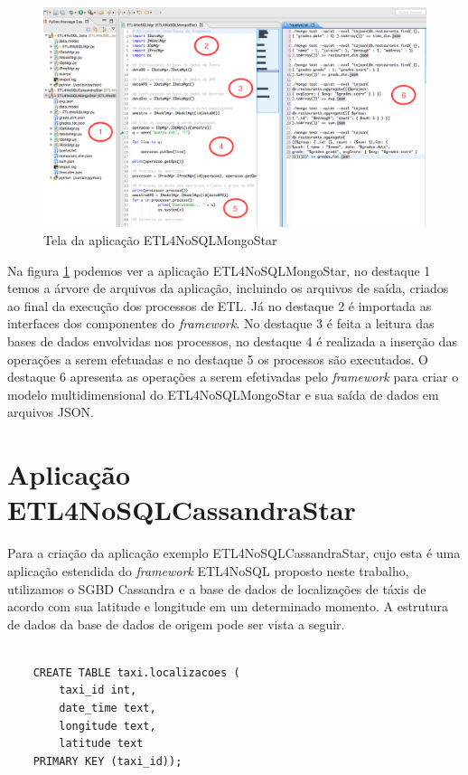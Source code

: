 \begin{figure}[h!]
	\centering
	\includegraphics[scale=0.4]{fig/ETL4NoSQLMongoStar.png}
	\caption{Tela da aplicação ETL4NoSQLMongoStar}
	\label{etl4nosqlmongostar}
\end{figure}

Na figura \ref{etl4nosqlmongostar} podemos ver a aplicação ETL4NoSQLMongoStar, no destaque 1 temos a árvore de arquivos da aplicação, incluindo os arquivos de saída, criados ao final da execução dos processos de ETL. Já no destaque 2 é importada as interfaces dos componentes do \textit{framework}. No destaque 3 é feita a leitura das bases de dados envolvidas nos processos, no destaque 4 é realizada a inserção das operações a serem efetuadas e no destaque 5 os processos são executados. O destaque 6 apresenta as operações a serem efetivadas pelo \textit{framework} para criar o modelo multidimensional do ETL4NoSQLMongoStar e sua saída de dados em arquivos JSON.

\section{Aplicação ETL4NoSQLCassandraStar}

Para a criação da aplicação exemplo ETL4NoSQLCassandraStar, cujo esta é uma aplicação estendida do \textit{framework} ETL4NoSQL proposto neste trabalho, utilizamos o SGBD Cassandra e a base de dados de localizações de táxis de acordo com sua latitude e longitude em um determinado momento. A estrutura de dados da base de dados de origem pode ser vista a seguir.

\begin{lstlisting}[frame=single, language=Oberon-2, basicstyle=\tiny]

	CREATE TABLE taxi.localizacoes (  
		taxi_id int, 
		date_time text,
		longitude text,
		latitude text 
	PRIMARY KEY (taxi_id));

\end{lstlisting}

